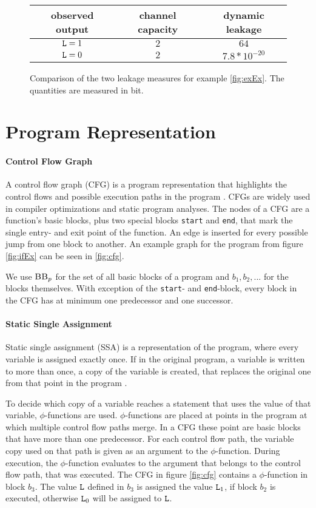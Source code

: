 \begin{figure}
    \centering
    \begin{tabular}{ |c|c|c| } 
        \hline
        observed output & channel capacity & dynamic leakage \\
        \hline
        $\mathtt{L} = 1$ & $2$ & $64$ \\ 
        $\mathtt{L} = 0$ & $2$ & $7.8 * 10^{-20}$ \\ 
        \hline
    \end{tabular}
    \caption{Comparison of the two leakage measures for example \ref{fig:exEx}. The quantities are measured in bit.}
    \label{tab:comp}
\end{figure}

\section{Program Representation}

\paragraph{Control Flow Graph}
A control flow graph (CFG) is a program representation that highlights the control flows and possible execution paths in the program \cite{allen70}. CFGs are widely used in compiler optimizations and static program analyses. The nodes of a CFG are a function's basic blocks, plus two special blocks \texttt{start} and \texttt{end}, that mark the single entry- and exit point of the function. An edge is inserted for every possible jump from one block to another. An example graph for the program from figure \ref{fig:ifEx} can be seen in \ref{fig:cfg}.

We use $\mbb_p$ for the set of all basic blocks of a program \p and $b_1, b_2, ...$ for the blocks themselves. With exception of the \texttt{start}- and \texttt{end}-block, every block in the CFG has at minimum one predecessor and one successor.

\paragraph{Static Single Assignment}
Static single assignment (SSA) is a representation of the program, where every variable is assigned exactly once. If in the original program, a variable is written to more than once, a copy of the variable is created, that replaces the original one from that point in the program \cite{rosen88}. 

 To decide which copy of a variable reaches a statement that uses the value of that variable, $\phi$-functions are used. $\phi$-functions are placed at points in the program at which multiple control flow paths merge. In a CFG these point are basic blocks that have more than one predecessor. For each control flow path, the variable copy used on that path is given as an argument to the $\phi$-function. During execution, the $\phi$-function evaluates to the argument that belongs to the control flow path, that was executed. The CFG in figure \ref{fig:cfg} contains a $\phi$-function in block $b_3$. The value $\mathtt{L}$ defined in $b_3$ is assigned the value $\mathtt{L}_1$, if block $b_2$ is executed, otherwise $\mathtt{L}_0$ will be assigned to $\mathtt{L}$.


